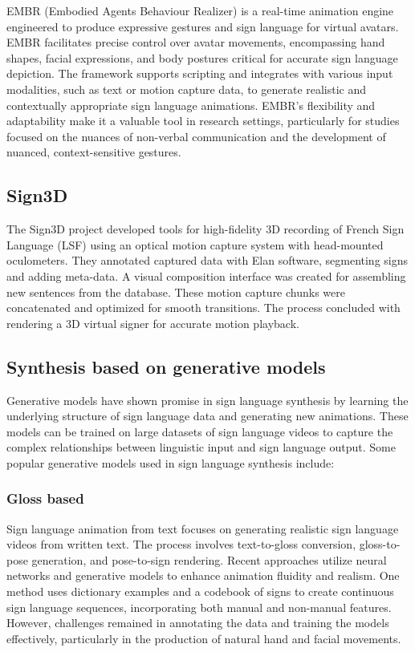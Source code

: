 EMBR (Embodied Agents Behaviour Realizer)\cite{TODO} is a real-time animation engine engineered to produce expressive gestures and sign language for virtual avatars. EMBR facilitates precise control over avatar movements, encompassing hand shapes, facial expressions, and body postures critical for accurate sign language depiction. The framework supports scripting and integrates with various input modalities, such as text or motion capture data, to generate realistic and contextually appropriate sign language animations. EMBR's flexibility and adaptability make it a valuable tool in research settings, particularly for studies focused on the nuances of non-verbal communication and the development of nuanced, context-sensitive gestures.

\subsection{Sign3D}

The Sign3D project developed tools for high-fidelity 3D recording of French Sign Language (LSF) using an optical motion capture system with head-mounted oculometers. They annotated captured data with Elan software, segmenting signs and adding meta-data. A visual composition interface was created for assembling new sentences from the database. These motion capture chunks were concatenated and optimized for smooth transitions. The process concluded with rendering a 3D virtual signer for accurate motion playback.

\subsection{Synthesis based on generative models}

Generative models have shown promise in sign language synthesis by learning the underlying structure of sign language data and generating new animations. These models can be trained on large datasets of sign language videos to capture the complex relationships between linguistic input and sign language output. Some popular generative models used in sign language synthesis include:

\subsubsection{Gloss based}

Sign language animation from text focuses on generating realistic sign language videos from written text. The process involves text-to-gloss conversion, gloss-to-pose generation, and pose-to-sign rendering. Recent approaches utilize neural networks and generative models to enhance animation fluidity and realism. One method uses dictionary examples and a codebook of signs to create continuous sign language sequences, incorporating both manual and non-manual features\cite{TODO}. However, challenges remained in annotating the data and training the models effectively, particularly in the production of natural hand and facial movements.

